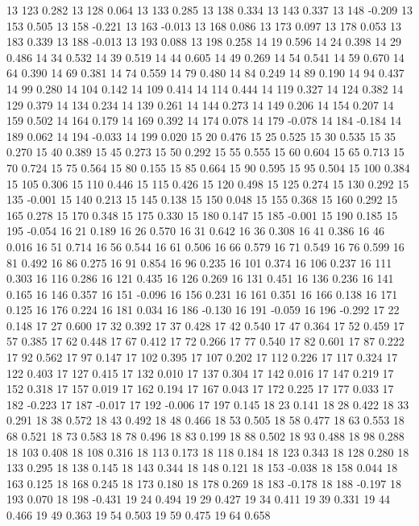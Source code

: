 13 123 0.282
13 128 0.064
13 133 0.285
13 138 0.334
13 143 0.337
13 148 -0.209
13 153 0.505
13 158 -0.221
13 163 -0.013
13 168 0.086
13 173 0.097
13 178 0.053
13 183 0.339
13 188 -0.013
13 193 0.088
13 198 0.258
14 19 0.596
14 24 0.398
14 29 0.486
14 34 0.532
14 39 0.519
14 44 0.605
14 49 0.269
14 54 0.541
14 59 0.670
14 64 0.390
14 69 0.381
14 74 0.559
14 79 0.480
14 84 0.249
14 89 0.190
14 94 0.437
14 99 0.280
14 104 0.142
14 109 0.414
14 114 0.444
14 119 0.327
14 124 0.382
14 129 0.379
14 134 0.234
14 139 0.261
14 144 0.273
14 149 0.206
14 154 0.207
14 159 0.502
14 164 0.179
14 169 0.392
14 174 0.078
14 179 -0.078
14 184 -0.184
14 189 0.062
14 194 -0.033
14 199 0.020
15 20 0.476
15 25 0.525
15 30 0.535
15 35 0.270
15 40 0.389
15 45 0.273
15 50 0.292
15 55 0.555
15 60 0.604
15 65 0.713
15 70 0.724
15 75 0.564
15 80 0.155
15 85 0.664
15 90 0.595
15 95 0.504
15 100 0.384
15 105 0.306
15 110 0.446
15 115 0.426
15 120 0.498
15 125 0.274
15 130 0.292
15 135 -0.001
15 140 0.213
15 145 0.138
15 150 0.048
15 155 0.368
15 160 0.292
15 165 0.278
15 170 0.348
15 175 0.330
15 180 0.147
15 185 -0.001
15 190 0.185
15 195 -0.054
16 21 0.189
16 26 0.570
16 31 0.642
16 36 0.308
16 41 0.386
16 46 0.016
16 51 0.714
16 56 0.544
16 61 0.506
16 66 0.579
16 71 0.549
16 76 0.599
16 81 0.492
16 86 0.275
16 91 0.854
16 96 0.235
16 101 0.374
16 106 0.237
16 111 0.303
16 116 0.286
16 121 0.435
16 126 0.269
16 131 0.451
16 136 0.236
16 141 0.165
16 146 0.357
16 151 -0.096
16 156 0.231
16 161 0.351
16 166 0.138
16 171 0.125
16 176 0.224
16 181 0.034
16 186 -0.130
16 191 -0.059
16 196 -0.292
17 22 0.148
17 27 0.600
17 32 0.392
17 37 0.428
17 42 0.540
17 47 0.364
17 52 0.459
17 57 0.385
17 62 0.448
17 67 0.412
17 72 0.266
17 77 0.540
17 82 0.601
17 87 0.222
17 92 0.562
17 97 0.147
17 102 0.395
17 107 0.202
17 112 0.226
17 117 0.324
17 122 0.403
17 127 0.415
17 132 0.010
17 137 0.304
17 142 0.016
17 147 0.219
17 152 0.318
17 157 0.019
17 162 0.194
17 167 0.043
17 172 0.225
17 177 0.033
17 182 -0.223
17 187 -0.017
17 192 -0.006
17 197 0.145
18 23 0.141
18 28 0.422
18 33 0.291
18 38 0.572
18 43 0.492
18 48 0.466
18 53 0.505
18 58 0.477
18 63 0.553
18 68 0.521
18 73 0.583
18 78 0.496
18 83 0.199
18 88 0.502
18 93 0.488
18 98 0.288
18 103 0.408
18 108 0.316
18 113 0.173
18 118 0.184
18 123 0.343
18 128 0.280
18 133 0.295
18 138 0.145
18 143 0.344
18 148 0.121
18 153 -0.038
18 158 0.044
18 163 0.125
18 168 0.245
18 173 0.180
18 178 0.269
18 183 -0.178
18 188 -0.197
18 193 0.070
18 198 -0.431
19 24 0.494
19 29 0.427
19 34 0.411
19 39 0.331
19 44 0.466
19 49 0.363
19 54 0.503
19 59 0.475
19 64 0.658
